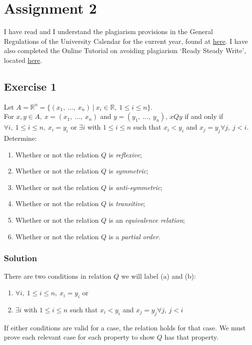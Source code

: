 \documentclass[12pt]{article}
\begin{document}
\section*{Assignment 2}

I have read and I understand the plagiarism provisions in the General Regulations of the University Calendar for the current year, found at \href{http://www.tcd.ie/calendar}{here}.
I have also completed the Online Tutorial on avoiding plagiarism ‘Ready Steady Write’, located \href{http://tcd-ie.libguides.com/plagiarism/ready-steady-write}{here}.

\subsection*{Exercise 1}

Let $A = \mathbb{R}^n = \{ (x_1,\ \ldots,\ x_n)\ |\ x_i \in \mathbb{R},\ 1 \leq i \leq n \}$.\\
For $x,y \in A,\ x = (x_1,\ \ldots,\ x_n)$ and $y = (y_1,\ \ldots,\ y_n)$,
$xQy$ if and only if $\forall i,\ 1 \leq i \leq n,\ x_i = y_i$
or $\exists i$ with $1 \leq i \leq n$ such that $x_i < y_i$ and $x_j = y_j \forall j,\ j < i$.
Determine:
\begin{enumerate}[label = (\roman*)]
	\itemsep0em
	\item Whether or not the relation $Q$ is \textit{reflexive};
	\item Whether or not the relation $Q$ is \textit{symmetric};
	\item Whether or not the relation $Q$ is \textit{anti-symmetric};
	\item Whether or not the relation $Q$ is \textit{transitive};
	\item Whether or not the relation $Q$ is an \textit{equivalence relation};
	\item Whether or not the relation $Q$ is a \textit{partial order}.
\end{enumerate}

\subsubsection*{Solution}

There are two conditions in relation $Q$ we will label (a) and (b):
\begin{enumerate}[label = (\alph*)]
	\itemsep0em
	\item $\forall i,\ 1 \leq i \leq n,\ x_i = y_i$ \label{cond_a} or
	\item $\exists i$ with $1 \leq i \leq n$ such that $x_i < y_i$ and $x_j = y_j \forall j,\ j < i$ \label{cond_b}
\end{enumerate}
If either conditions are valid for a case, the relation holds for that case.
We must prove each relevant case for each property to show $Q$ has that property.
\end{document}
